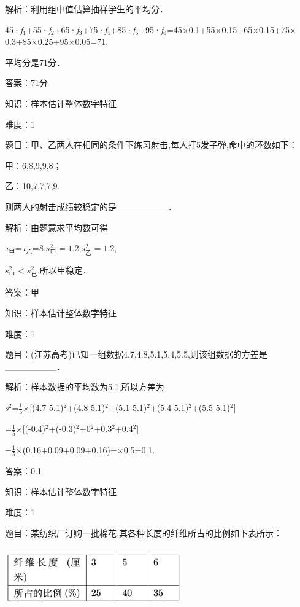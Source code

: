 \documentclass{article} %
\begin{document}
解析：利用组中值估算抽样学生的平均分．

45·\textit{f}${}_{1}$+55·\textit{f}${}_{2}$+65·\textit{f}${}_{3}$+75·\textit{f}${}_{4}$+85·\textit{f}${}_{5}$+95·\textit{f}${}_{6}$=45$\mathrm{\times}$0.1+55$\mathrm{\times}$0.15+65$\mathrm{\times}$0.15+75$\mathrm{\times}$0.3+85$\mathrm{\times}$0.25+95$\mathrm{\times}$0.05=71,

平均分是71分．

答案：71分

知识：样本估计整体数字特征

难度：1

题目：甲、乙两人在相同的条件下练习射击,每人打5发子弹,命中的环数如下：

甲：6,8,9,9,8；

乙：10,7,7,7,9.

则两人的射击成绩较稳定的是\_\_\_\_\_\_\_\_．

解析：由题意求平均数可得

\textit{x}${}_{\textrm{甲}}$=\textit{x}${}_{\textrm{乙}}$=8,$s_{\text{甲}}^2=1.2$,$s_{\text{乙}}^2=1.2$,

$s_{\text{甲}}^2<s_{\text{已}}^2$,所以甲稳定．

答案：甲

知识：样本估计整体数字特征

难度：1

题目：(江苏高考)已知一组数据4.7,4.8,5.1,5.4,5.5,则该组数据的方差是\_\_\_\_\_\_\_\_．

解析：样本数据的平均数为5.1,所以方差为

\textit{s}${}^{2}$=$\frac{1}{5}\mathrm{\times}$[(4.7-5.1)${}^{2}$+(4.8-5.1)${}^{2}$+(5.1-5.1)${}^{2}$+(5.4-5.1)${}^{2}$+(5.5-5.1)${}^{2}$]

=$\frac{1}{5}\mathrm{\times}$[(-0.4)${}^{2}$+(-0.3)${}^{2}$+0${}^{2}$+0.3${}^{2}$+0.4${}^{2}$]

=$\frac{1}{5}\mathrm{\times}$(0.16+0.09+0.09+0.16)=$\mathrm{\times}$0.5=0.1.

答案：0.1

知识：样本估计整体数字特征

难度：1

题目：某纺织厂订购一批棉花,其各种长度的纤维所占的比例如下表所示：

\includegraphics*[width=3.00in, height=1in, keepaspectratio=false]{image118}
\end{document}
